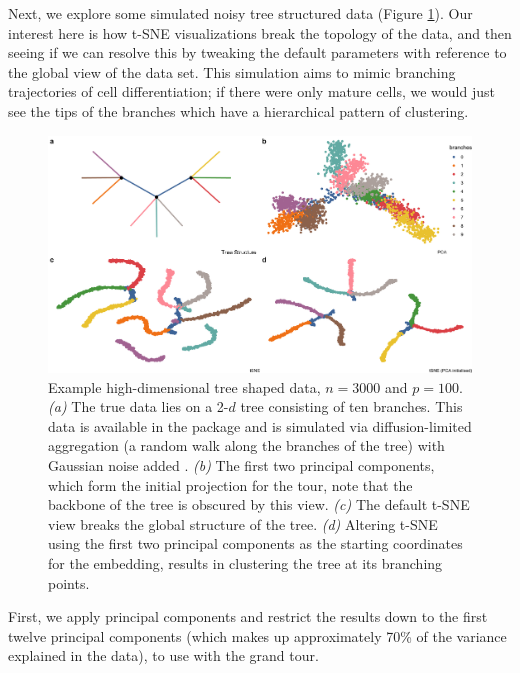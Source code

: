 \documentclass[article,notitle]{jdssv}
\begin{document}
Next, we explore some simulated noisy tree structured data (Figure
\ref{fig:fake-trees}). Our interest here is how t-SNE visualizations break the
topology of the data, and then seeing if we can resolve this by tweaking the
default parameters with reference to the global view of the data set.
This simulation aims to mimic branching trajectories of cell differentiation;
if there were only mature cells, we would just see the tips of the branches
which have a hierarchical pattern of clustering.



\begin{figure}

{\centering \includegraphics[width=\textwidth]{./img/tree-view} 

}

\caption{Example high-dimensional tree shaped data, \(n = 3000\) and \(p = 100\). \emph{(a)} The true data lies on a 2-\(d\) tree consisting of ten branches. This data is available in the  package and is simulated via diffusion-limited aggregation (a random walk along the branches of the tree) with Gaussian noise added \citep{Moon2019-ce}. \emph{(b)} The first two principal components, which form the initial projection for the tour, note that the backbone of the tree is obscured by this view. \emph{(c)} The default t-SNE view breaks the global structure of the tree. \emph{(d)} Altering t-SNE using the first two principal components as the starting coordinates for the embedding, results in clustering the tree at its branching points.}\label{fig:fake-trees}
\end{figure}

First, we apply principal components and restrict the results down to the first
twelve principal components (which makes up approximately 70\% of the variance
explained in the data), to use with the grand tour.
\end{document}
